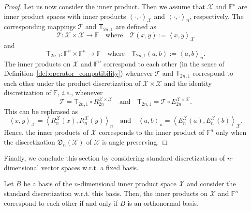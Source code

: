 \documentclass[a4paper]{paper}
\makeatletter
\newcommand{\Discr}{\mathfrak{D}}
\newcommand{\VecSpace}[1]{\mathscr{#1}}
\newcommand{\Field}{\mathbb{F}}
\newcommand{\Op}[1]{\mathcal{#1}}
\newcommand{\DiscOp}[1]{\mathsf{#1}}
\newcommand*{\EXT}[2]{\ensuremath{E_{#1}^{#2}}}
\newcommand*{\REST}[2]{\ensuremath{R_{#1}^{#2}}}
\newcommand*{\RnX}{\ensuremath{\REST{n}{\VecSpace{X}}}}
\newcommand*{\EnX}{\ensuremath{\EXT{n}{\VecSpace{X}}}}
\newcommand{\ip}[2]{\left \langle #1,#2 \right\rangle}
\newcommand{\ie}{\textsl{i.e.}\xspace}
\newcommand{\wrt}{{w.r.t.}\@\xspace}
\makeatother
\begin{document}
\begin{proof}
Let us now consider the inner product. Then we assume that $\VecSpace{X}$ and $\Field^{n}$ are inner 
product spaces with inner products $\ip{\cdot}{\cdot}_\VecSpace{X}$ and $\ip{\cdot}{\cdot}_{n}$, 
respectively. The corresponding mappings $\Op{T}$ and $\DiscOp{T}_{2n,1}$ are 
defined as  
\[ \Op{T} \colon \VecSpace{X} \times \VecSpace{X}  \to \Field  \quad\text{where}\quad \Op{T}(x,y):=\ip{x}{y}_{\VecSpace{X}} \] 
and 
\[ \DiscOp{T}_{2n,1} \colon \Field^{n} \times \Field^{n}  \to \Field  \quad\text{where}\quad \DiscOp{T}_{2n,1}(a,b):=\ip{a}{b}_{n}. \] 
The inner products on $\VecSpace{X}$ and $\Field^{n}$ 
correspond to each other (in the sense of Definition~\ref{def:operator_compatibility})
whenever $\Op{T}$ and $\DiscOp{T}_{2n,1}$ correspond to each other 
under the product discretization of $\VecSpace{X}\times \VecSpace{X}$ and the identity discretization of 
$\Field$, \ie, whenever 
\[ \Op{T} =  \DiscOp{T}_{2n,1} \circ R_{2n}^{\VecSpace{X}\times \VecSpace{X}} 
   \quad\text{and}\quad 
   \DiscOp{T}_{2n,1} =  \Op{T} \circ E_{2n}^{\VecSpace{X}\times \VecSpace{X}}.
\]
This can be rephrased as
\[ \ip{x}{y}_{\VecSpace{X}} =  \ip{\RnX(x)}{\RnX(y)}_{n}
    \quad\text{and}\quad 
   \ip{a}{b}_{n} = \ip{\EnX(a)}{\EnX(b)}_{\VecSpace{X}}.
\]
Hence, the inner products of $\VecSpace{X}$ corresponds to the inner product of $\Field^{n}$ 
only when the discretization $\Discr_{n}(\VecSpace{X})$ of $\VecSpace{X}$ is angle preserving.
\end{proof}
Finally, we conclude this section by considering standard discretizations of $n$-dimensional vector spaces
\wrt a fixed basis. 
\begin{theorem}
  Let $B$ be a basis of the $n$-dimensional inner product space $\VecSpace{X}$ and 
  consider the standard discretization \wrt this basis. 
   Then, the inner products on $\VecSpace{X}$ and $\Field^{n}$ correspond to each other 
   if and only if $B$ is an orthonormal basis.
\end{theorem}
\end{document}
